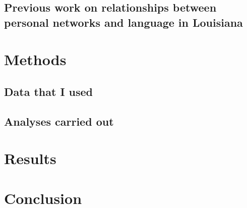     \subsection{Previous work on relationships between personal networks and language in Louisiana}
  \section{Methods}
    \subsection{Data that I used}
    \subsection{Analyses carried out}
  \section{Results}
  \section{Conclusion}


